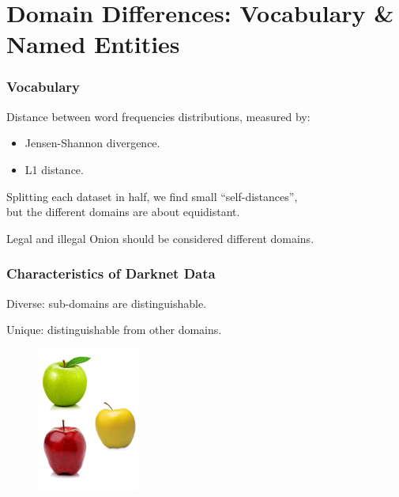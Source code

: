\documentclass[t,xcolor={svgnames,table}]{beamer}
\begin{document}
\section{Domain Differences: Vocabulary \& Named Entities}

\begin{frame}
	\frametitle{Vocabulary}
	Distance between word frequencies distributions, measured by:
	\begin{itemize}
	\item Jensen-Shannon divergence.
	\item L1 distance.
	\end{itemize}
	
	Splitting each dataset in half, we find small ``self-distances'', \\
	but the different domains are about equidistant.
	\vfill
	\pause
	
	\begin{center}
	\end{center}
	\vfill
	\pause
	
	Legal and illegal Onion should be considered different domains.
\end{frame}

\begin{frame}
	\frametitle{Characteristics of Darknet Data}
	
	Diverse: sub-domains are distinguishable.
	\vfill
	
	Unique: distinguishable from other domains.
	
	\begin{figure}
		\centering
		\includegraphics[width=0.3\textwidth]{3different.png}
	\end{figure}
\end{frame}
\end{document}
